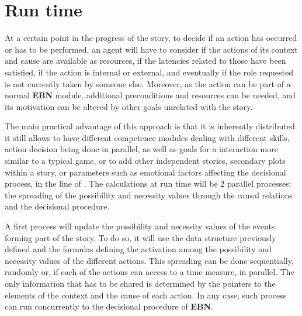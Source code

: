 \documentclass[
		twoside,openright,titlepage,numbers=noenddot,manychapters,
		headinclude,%
                footinclude=false,cleardoublepage=empty,
                BCOR=5mm,
		fontsize=11pt, %
                 enabledeprecatedfontcommands]{scrreprt}
\begin{document}
\section{Run time}

At a certain point in the progress of the story, to decide if an action has occurred or has to be performed, an agent will have to consider if the actions of its context and cause are available as resources, if the latencies  related to those have been satisfied, if the action is internal or external, and eventually if the role requested is not currently taken by someone else. Moreover, as the action can be part of a normal \textbf{EBN} module, additional preconditions and resources can be needed, and its motivation can be altered by other goals unrelated with the story.

The main practical advantage of this approach is that it is inherently distributed: it still allows to have different competence modules dealing with different skills, action decision being done in parallel, as well as goals for a interaction more similar to a typical game, or to add other independent stories, secondary plots within a story, or parameters such as emotional factors affecting the decisional process, in the line of \cite{johansson2009affective}. The calculations at run time will be 2 parallel processes: the spreading of the possibility and necessity values through the causal relations and the decisional procedure.

A first process will update the possibility and necessity values of the events forming part of the story. To do so, it will use the data structure previously defined and the formulas defining the activation among the possibility and necessity values of the different actions. This spreading can be done sequentially, randomly or, if each of the actions can access to a time measure, in parallel. The only information that has to be shared is determined by the pointers to the elements of the context and the cause of each action. In any case, such process can run concurrently to the decisional procedure of \textbf{EBN}.
\end{document}
